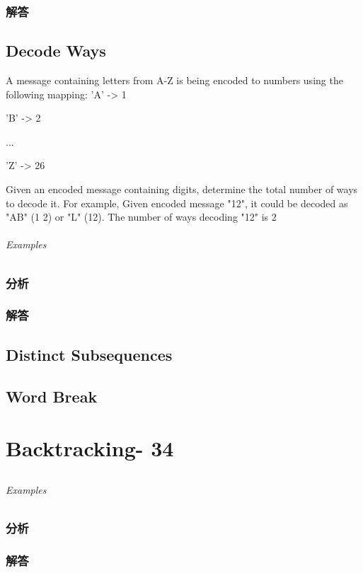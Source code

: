 \documentclass[UTF8,a4paper,12pt]{ctexbook}
\begin{document}
	\subsection{解答}
	
\section{Decode Ways}
	A message containing letters from A-Z is being encoded to numbers using the following mapping:
	'A' -> 1
	
	'B' -> 2
	
	...
	
	'Z' -> 26
	
	Given an encoded message containing digits, determine the total number of ways to decode it.
	For example, Given encoded message "12", it could be decoded as "AB" (1 2) or "L" (12).
	The number of ways decoding "12" is 2
	\subparagraph{Examples}
	
	\subsection{分析}
	
	\subsection{解答}
	

\section{Distinct Subsequences}

\section{Word Break}


\chapter{Backtracking- 34}
\section{}
	
	\subparagraph{Examples}
	
	\subsection{分析}
	
	\subsection{解答}
	
\end{document}
